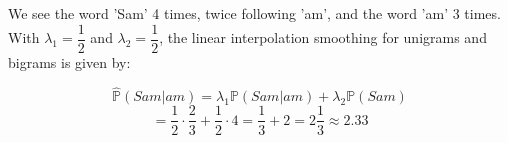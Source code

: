 \documentclass[11pt,journal]{article}
\begin{document}
	We see the word 'Sam' 4 times, twice following 'am', and the word 'am' 3 times. With $\lambda_1 = \dfrac{1}{2}$ and $\lambda_2 = \dfrac{1}{2}$, the linear interpolation smoothing for unigrams and bigrams is given by:
	
	\[\hat{\mathbb{P}}(Sam|am) = \lambda_1\mathbb{P}(Sam|am) + \lambda_2\mathbb{P}(Sam) \]
	\[ = \dfrac{1}{2} \cdot \dfrac{2}{3} + \dfrac{1}{2} \cdot 4 = \dfrac{1}{3} + 2 = 2\dfrac{1}{3} \approx 2.33 \]
	
	

	
\end{document}
